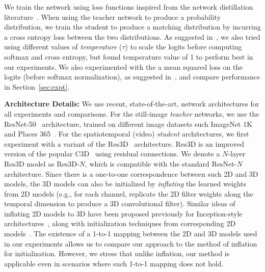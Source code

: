 \documentclass[10pt,twocolumn,letterpaper]{article}
\begin{document}
We train the network using loss functions inspired from the network distillation literature~\cite{bucilua2006model,hinton2015distilling}. When using the teacher network to produce a probability
distribution, we train the student to produce a matching distribution by incurring a cross entropy loss between the two distributions.
As suggested in~\cite{hinton2015distilling}, we also tried using different
values of {\em temperature} ($\tau$) to scale the logits before computing softmax and cross entropy, but found temperature
value of 1 to perform best in our experiments. We also experimented with the a mean squared loss on the logits (before
softmax normalization), as suggested in~\cite{bucilua2006model}, and compare performance in Section~\ref{sec:expt}.


{\bf \noindent Architecture Details:}
We use recent, state-of-the-art, network architectures for all experiments and comparisons. For the still-image {\em teacher} networks, we use the  ResNet-50~\cite{He_16} architecture, trained on different image datasets such ImageNet 1K~\cite{ImageNet} and Places 365~\cite{zhou2017places}. For the spatiotemporal (video) {\em student} architectures, we first experiment with a variant of the Res3D~\cite{tran2017convnet} architecture. Res3D is an improved version of the popular
C3D~\cite{Tran_15} using residual connections. We denote a $N$-layer Res3D model as Res3D-$N$, which is compatible with the standard ResNet-$N$~\cite{He_16} architecture. Since there is a one-to-one correspondence between such 2D and 3D models,
the 3D models can also be initialized by {\em inflating} the learned weights from 2D models (e.g., for each channel, replicate the 2D filter weights along the temporal dimension to produce a 3D convolutional filter). Similar ideas of inflating 2D models to 3D have  been proposed previously for Inception-style architectures~\cite{carreira2017quo}, along with initialization techniques from corresponding 2D models~\cite{carreira2017quo,Feichtenhofer_17,Feichtenhofer_16b}. The existence of a 1-to-1 mapping between the 2D and 3D models used in our experiments allows us to compare our approach to the method of inflation for initialization. However, we stress that unlike inflation, our method is applicable even in scenarios where such 1-to-1 mapping does not hold.
\end{document}
